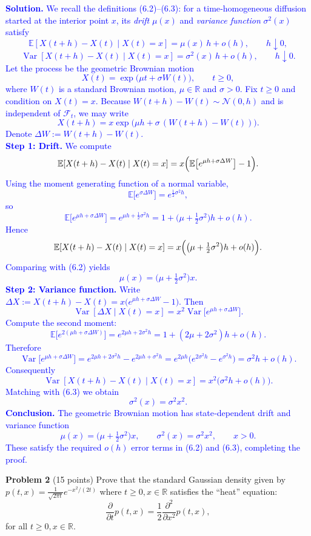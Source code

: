 \documentclass{article}
\begin{document}
\textcolor{blue}{\textbf{Solution.} We recall the definitions (6.2)–(6.3): for a time‑homogeneous diffusion started at the interior point $x$, its \emph{drift} $\mu(x)$ and \emph{variance function} $\sigma^{2}(x)$ satisfy $$\mathbb{E}[X(t+h)-X(t)\mid X(t)=x]=\mu(x)\,h+o(h),\qquad h\downarrow0,$$ $$\operatorname{Var}[X(t+h)-X(t)\mid X(t)=x]=\sigma^{2}(x)\,h+o(h),\qquad h\downarrow0.$$ Let the process be the geometric Brownian motion $$X(t)=\exp\!\bigl(\mu t+\sigma W(t)\bigr),\qquad t\ge0,$$ where $W(t)$ is a standard Brownian motion, $\mu\in\mathbb{R}$ and $\sigma>0$. Fix $t\ge0$ and condition on $X(t)=x$. Because $W(t+h)-W(t)\sim\mathcal N(0,h)$ and is independent of $\mathcal F_{t}$, we may write $$X(t+h)=x\exp\!\bigl(\mu h+\sigma\,(W(t+h)-W(t))\bigr).$$ Denote $\Delta W:=W(t+h)-W(t)$.\\\textbf{Step 1: Drift.} We compute $$\mathbb{E}[X(t+h)-X(t)\mid X(t)=x]=x\Bigl(\mathbb{E}\bigl[e^{\mu h+\sigma\Delta W}\bigr]-1\Bigr).$$ Using the moment generating function of a normal variable, $$\mathbb{E}\bigl[e^{\sigma\Delta W}\bigr]=e^{\tfrac12\sigma^{2}h},$$ so $$\mathbb{E}\bigl[e^{\mu h+\sigma\Delta W}\bigr]=e^{\mu h+\tfrac12\sigma^{2}h}=1+\!\bigl(\mu+\tfrac12\sigma^{2}\bigr)h+o(h).$$ Hence $$\mathbb{E}[X(t+h)-X(t)\mid X(t)=x]=x\Bigl(\bigl(\mu+\tfrac12\sigma^{2}\bigr)h+o(h)\Bigr).$$ Comparing with (6.2) yields $$\boxed{\mu(x)=\bigl(\mu+\tfrac12\sigma^{2}\bigr)x.}$$ \textbf{Step 2: Variance function.} Write $\Delta X:=X(t+h)-X(t)=x\bigl(e^{\mu h+\sigma\Delta W}-1\bigr)$. Then $$\operatorname{Var}[\Delta X\mid X(t)=x]=x^{2}\operatorname{Var}\!\bigl[e^{\mu h+\sigma\Delta W}\bigr].$$ Compute the second moment: $$\mathbb{E}\bigl[e^{2(\mu h+\sigma\Delta W)}\bigr]=e^{2\mu h+2\sigma^{2}h}=1+(2\mu+2\sigma^{2})h+o(h).$$ Therefore $$\operatorname{Var}\!\bigl[e^{\mu h+\sigma\Delta W}\bigr]=e^{2\mu h+2\sigma^{2}h}-e^{2\mu h+\sigma^{2}h}=e^{2\mu h}\bigl(e^{2\sigma^{2}h}-e^{\sigma^{2}h}\bigr)=\sigma^{2}h+o(h).$$ Consequently $$\operatorname{Var}[X(t+h)-X(t)\mid X(t)=x]=x^{2}\bigl(\sigma^{2}h+o(h)\bigr).$$ Matching with (6.3) we obtain $$\boxed{\sigma^{2}(x)=\sigma^{2}x^{2}.}$$ \textbf{Conclusion.} The geometric Brownian motion has state‑dependent drift and variance function $$\mu(x)=\bigl(\mu+\tfrac12\sigma^{2}\bigr)x,\qquad \sigma^{2}(x)=\sigma^{2}x^{2},\qquad x>0.$$ These satisfy the required $o(h)$ error terms in (6.2) and (6.3), completing the proof.}


\textbf{Problem 2}   (15 points) Prove that the standard Gaussian density given by 
$p(t, x) = \frac{1}{\sqrt{2\pi t}} e^{-x^2/(2t)}$
where $t \geq 0, x \in \mathbb{R}$ satisfies the “heat” equation:
$$\frac{\partial}{\partial t}p(t, x) = \frac{1}{2} \frac{\partial^2}{\partial x^2} p(t, x),$$
for all $t \geq 0, x \in \mathbb{R}$.
\end{document}
